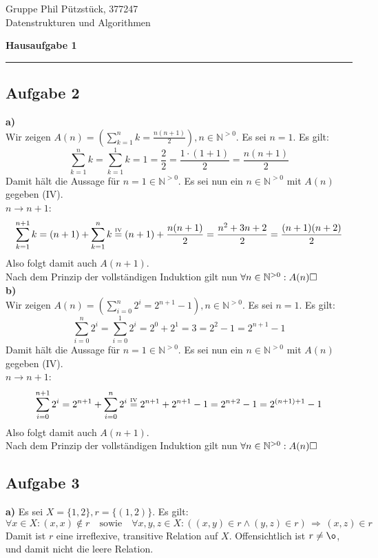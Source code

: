 \documentclass[a4paper,graphics,11pt]{article}
\newcommand{\aufgabe}[1]{\subsection*{Aufgabe #1}}
\newcommand{\up}[2]{\mathrel{\overset{\makebox[0pt]{\mbox{\normalfont\tiny #2}}}{#1}}}
\begin{document}
\noindent Gruppe              \hfill Phil Pützstück, 377247\\
\noindent Datenstrukturen und Algorithmen\\
\begin{center}
	\LARGE{\textbf{Hausaufgabe 1}}
\end{center}
\begin{center}
\rule[0.1ex]{\textwidth}{1pt}
\end{center}

\aufgabe{2}
\textbf{a)}\\
Wir zeigen $A(n) = \left(\sum_{k=1}^{n} k = \frac{n(n+1)}{2}\right), n \in \mathbb{N}^{>0}$.
Es sei $n = 1$. Es gilt:
$$
	\sum_{k=1}^{n} k
	= \sum_{k=1}^{1} k
	= 1
	= \frac{2}{2}
	= \frac{1\cdot(1+1)}{2}
	= \frac{n(n+1)}{2}
$$
Damit hält die Aussage für $n = 1 \in \mathbb{N}^{>0}$.
Es sei nun ein $n \in \mathbb{N}^{>0}$ mit $A(n)$ gegeben (IV). \\
$n \to n+1$:
$$
	\sum_{k=1}^{n+1} k = (n+1) + \sum_{k=1}^{n} k
	\up{=}{IV} (n+1) + \frac{n(n+1)}{2}
	= \frac{n^2+3n+2}{2}
	= \frac{(n+1)(n+2)}{2}
$$
Also folgt damit auch $A(n+1)$. \\
Nach dem Prinzip der vollständigen Induktion gilt nun $\forall n \in \mathbb{N}^{>0}: A(n)\hfill\square$
\\

\textbf{b)}\\
Wir zeigen $A(n) = \left(\sum_{i=0}^{n} 2^i = 2^{n+1} - 1\right), n \in \mathbb{N}^{>0}$.
Es sei $n = 1$. Es gilt:
$$
	\sum_{i=0}^{n} 2^i = \sum_{i=0}^{1} 2^i = 2^0 + 2^1 = 3 = 2^2 -1 = 2^{n+1} - 1
$$
Damit hält die Aussage für $n = 1 \in \mathbb{N}^{>0}$.
Es sei nun ein $n \in \mathbb{N}^{>0}$ mit $A(n)$ gegeben (IV). \\
$n \to n+1$:
$$
	\sum_{i=0}^{n+1} 2^i = 2^{n+1} + \sum_{i=0}^{n} 2^i
	\up{=}{IV} 2^{n+1} + 2^{n+1} - 1
	= 2^{n+2} - 1
	= 2^{(n+1)+1} - 1
$$
Also folgt damit auch $A(n+1)$. \\
Nach dem Prinzip der vollständigen Induktion gilt nun $\forall n \in \mathbb{N}^{>0}: A(n)\hfill\square$
\newpage

\aufgabe{3}

\textbf{a)}
Es sei $X = \{1,2\}, r = \{(1,2)\}$. Es gilt:
$$
	\forall x \in X : (x,x) \notin r
	\quad \text{sowie}\quad
	\forall x,y,z \in X : \left((x,y) \in r \land (y, z) \in r\right) \,\Longrightarrow\, (x,z) \in r
$$
Damit ist $r$ eine irreflexive, transitive Relation auf $X$.
Offensichtlich ist $r \neq \o$, und damit nicht die leere Relation.
\end{document}
